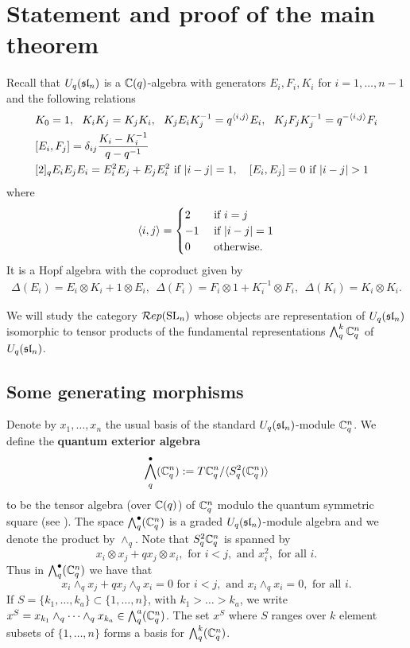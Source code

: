 \documentclass[10pt,leqno]{article}
\begin{document}
\section{Statement and proof of the main theorem}\label{sec:theorem}

Recall that $U_q(\sl_n) $ is a $ \bC(q)$-algebra with generators $ E_i, F_i, K_i $ for $ i = 1, \dots, n-1 $ and the following relations
\begin{align*}
& K_0=1, \ \ K_iK_j=K_jK_i, \ \ K_jE_iK_j^{-1} = q^{\la i,j \ra} E_i, \ \  K_jF_jK_j^{-1} = q^{-\la i,j \ra} F_i \\
& [E_i,F_j] = \delta_{ij} \frac{K_i - K_i^{-1}}{q-q^{-1}} \\
& [2]_q E_iE_jE_i = E_i^2E_j + E_jE_i^2 \text{ if } |i-j| = 1, \ \ \ [E_i,E_j]=0 \text{ if } |i-j|>1
\end{align*}
where 
$$\la i,j \ra = \begin{cases} 2 & \text{ if } i = j \\ -1 & \text{ if } |i-j|=1 \\ 0 & \text{ otherwise. } \end{cases}$$
It is a Hopf algebra with the coproduct given by
\begin{align} \label{eq:Hopf}
\Delta(E_i) = E_i \otimes K_i + 1 \otimes E_i, \ \ \Delta(F_i) = F_i \otimes 1 + K_i^{-1} \otimes F_i, \ \ \Delta(K_i) = K_i \otimes K_i. 
\end{align}


We will study the category $\Rep(\SL_n)$ whose objects are representation of $U_q(\sl_n) $ isomorphic to tensor products of the fundamental representations $\Alt^k_q \bC_q^n$ of $U_q(\sl_n)$.

\subsection{Some generating morphisms}
\label{sec:generating-morphisms}

Denote by $ x_1, \dots, x_n $ the usual basis of the standard $U_q(\sl_n)$-module $\bC_q^n $. We define the {\bf quantum exterior algebra}
$$ \Alt^\bullet_q(\bC_q^n) := T \bC_q^n / \langle S^2_q ( \bC_q^n) \rangle $$
to be the tensor algebra (over $\bC(q) $) of $ \bC_q^n $ modulo the quantum symmetric square (see \cite{BZ}). The space $ \Alt^\bullet_q(\bC_q^n) $ is a graded $U_q(\sl_n)$-module algebra and we denote the product by $ \wedge_q $. Note that $S^2_q \bC_q^n $ is spanned by 
$$ x_i \otimes x_j + q x_j \otimes x_i, \text{ for }  i < j , \text{ and } x_i^2, \text{ for all } i. $$ 
Thus in $ \Alt^\bullet_q(\bC_q^n) $ we have that
$$ x_i \wedge_q x_j + q x_j \wedge_q x_i = 0 \text{ for }  i < j, \text{ and } x_i \wedge_q x_i = 0, \text{ for all }  i. $$
If $ S =\{k_1, \dots, k_a\} \subset \{1, \dots, n\} $, with $ k_1 > \dots > k_a $, we write $ x^S = x_{k_1} \wedge_q \cdots \wedge_q x_{k_a} \in \Alt^a_q(\bC_q^n) $. The set $ x^S $ where $ S $ ranges over $ k $ element subsets of $ \{1, \dots, n \} $ forms a basis for $ \Alt^k_q(\bC_q^n) $.
\end{document}
